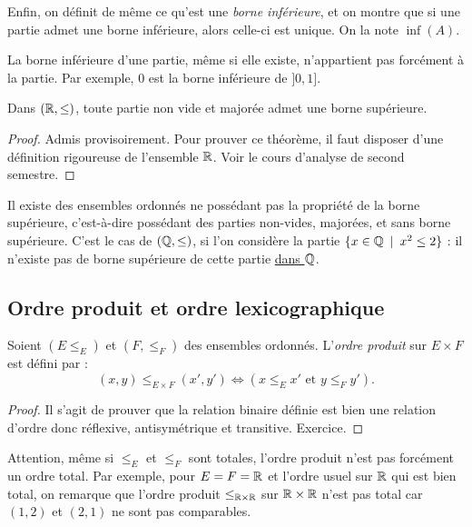 Enfin, on définit de même ce qu'est une \emph{borne inférieure}, et on montre que si une partie admet une borne inférieure, alors celle-ci est unique. On la note $\inf(A)$. 

La borne inférieure d'une partie, même si elle existe, n'appartient pas forcément à la partie. Par exemple, $0$ est la borne inférieure de $]0,1]$.

\begin{theoreme}
Dans $(\mathbb{R},\leq)$, toute partie non vide et majorée admet une borne supérieure.
\end{theoreme}
\begin{proof}
Admis provisoirement. Pour prouver ce théorème, il faut disposer d'une définition rigoureuse de l'ensemble $\mathbb{R}$. Voir le cours d'analyse de second semestre.
\end{proof}

Il existe des ensembles ordonnés ne possédant pas la propriété de la borne supérieure, c'est-à-dire possédant des parties non-vides, majorées, et sans borne supérieure. C'est le cas de $(\mathbb{Q},\leq)$, si l'on considère la partie $\{x\in \Q\:\mid\: x^2\leq 2\}$ : il n'existe pas de borne supérieure de cette partie \underline{dans $\mathbb{Q}$}.


\subsection{Ordre produit et ordre lexicographique}

\begin{propdef}
Soient $(E\leq_E)$ et $(F,\leq_F)$ des ensembles ordonnés.
L'\emph{ordre produit} sur $E\times F$ est défini par :
\[
(x,y) \leq_{E\times F} (x',y') \iff \left(x\leq_E x' \text{ et } y\leq_F y'\right).
\]
\end{propdef}
\begin{proof}
Il s'agit de prouver que la relation binaire définie est bien une relation d'ordre donc réflexive, antisymétrique et transitive. Exercice.
\end{proof}

Attention, même si $\leq_E$ et $\leq_F$ sont totales, l'ordre produit n'est pas forcément un ordre total. Par exemple, pour $E=F=\mathbb{R}$ et l'ordre usuel sur $\mathbb{R}$ qui est bien total, on remarque que l'ordre produit $\leq_{\mathbb{R}\times\mathbb{R}}$ sur $\mathbb{R}\times \mathbb{R}$ n'est pas total car $(1,2)$ et $(2,1)$ ne sont pas comparables.

